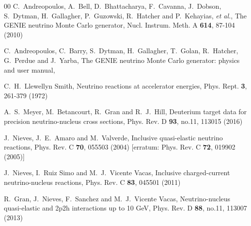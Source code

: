 \documentclass[aps,prl,twocolumn,superscriptaddress,nofootinbib]{revtex4-1}
\begin{document}
\begin{thebibliography}{00}
C.~Andreopoulos, A.~Bell, D.~Bhattacharya, F.~Cavanna, J.~Dobson, S.~Dytman, H.~Gallagher, P.~Guzowski, R.~Hatcher and P.~Kehayias, \textit{et al.},
The GENIE neutrino Monte Carlo generator,
Nucl. Instrum. Meth. A \textbf{614}, 87-104 (2010)

C.~Andreopoulos, C.~Barry, S.~Dytman, H.~Gallagher, T.~Golan, R.~Hatcher, G.~Perdue and J.~Yarba,
The GENIE neutrino Monte Carlo generator: physics and user manual,

C.~H.~Llewellyn Smith,
Neutrino reactions at accelerator energies,
Phys. Rept. \textbf{3}, 261-379 (1972)

A.~S.~Meyer, M.~Betancourt, R.~Gran and R.~J.~Hill,
Deuterium target data for precision neutrino-nucleus cross sections,
Phys. Rev. D \textbf{93}, no.11, 113015 (2016)

J.~Nieves, J.~E.~Amaro and M.~Valverde,
Inclusive quasi-elastic neutrino reactions,
Phys. Rev. C \textbf{70}, 055503 (2004)
[erratum: Phys. Rev. C \textbf{72}, 019902 (2005)]

J.~Nieves, I.~Ruiz Simo and M.~J.~Vicente Vacas,
Inclusive charged-current neutrino-nucleus reactions,
Phys. Rev. C \textbf{83}, 045501 (2011)

R.~Gran, J.~Nieves, F.~Sanchez and M.~J.~Vicente Vacas,
Neutrino-nucleus quasi-elastic and 2p2h interactions up to 10 GeV,
Phys. Rev. D \textbf{88}, no.11, 113007 (2013)


\end{thebibliography}
\end{document}

